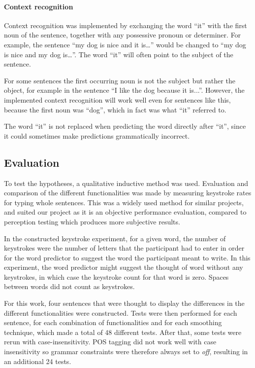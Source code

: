 \paragraph{Context recognition}
Context recognition was implemented by exchanging the word “it” with the first noun of the sentence, together with any possessive pronoun or determiner. For example, the sentence “my dog is nice and it is…” would be changed to “my dog is nice and my dog is…”. The word “it” will often point to the subject of the sentence.

For some sentences the first occurring noun is not the subject but rather the object, for example in the sentence “I like the dog because it is...”. However, the implemented context recognition will work well even for sentences like this, because the first noun was “dog”, which in fact was what “it” referred to.

The word “it” is not replaced when predicting the word directly after “it”, since it could sometimes make predictions grammatically incorrect.

\subsection{Evaluation}

To test the hypotheses, a qualitative inductive method was used. Evaluation and comparison of the different functionalities was made by measuring keystroke rates for typing whole sentences. This was a widely used method for similar projects\cite{keystrokes}, and suited our project as it is an objective performance evaluation, compared to perception testing which produces more subjective results.

In the constructed keystroke experiment, for a given word, the number of keystrokes were the number of letters that the participant had to enter in order for the word predictor to suggest the word the participant meant to write. In this experiment, the word predictor might suggest the thought of word without any keystrokes, in which case the keystroke count for that word is zero. Spaces between words did not count as keystrokes.

For this work, four sentences that were thought to display the differences in the different functionalities were constructed. Tests were then performed for each sentence, for each combination of functionalities and for each smoothing technique, which made a total of 48 different tests. After that, some tests were rerun with case-insensitivity. POS tagging did not work well with case insensitivity so grammar constraints were therefore always set to \emph{off}, resulting in an additional 24 tests.

